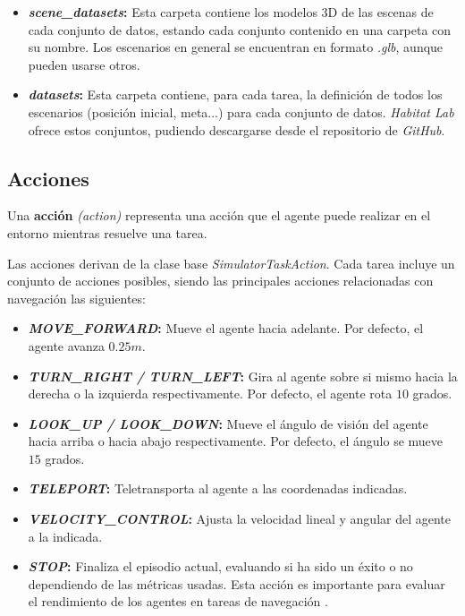 \newpage

\begin{itemize}
	\item \textbf{\textit{scene{\_}datasets}:} Esta carpeta contiene los modelos 3D de las escenas de cada conjunto de datos, estando cada conjunto contenido en una carpeta con su nombre. Los escenarios en general se encuentran en formato \textit{.glb}, aunque pueden usarse otros.
	\item \textbf{\textit{datasets}:} Esta carpeta contiene, para cada tarea, la definición de todos los escenarios (posición inicial, meta...) para cada conjunto de datos. \textit{Habitat Lab} ofrece estos conjuntos, pudiendo descargarse desde el repositorio de \textit{GitHub}. 
\end{itemize}

\subsection{Acciones}

Una \textbf{acción} \textit{(action)} representa una acción que el agente puede realizar en el entorno mientras resuelve una tarea.

Las acciones derivan de la clase base \textit{SimulatorTaskAction}. Cada tarea incluye un conjunto de acciones posibles, siendo las principales acciones relacionadas con navegación las siguientes:

\begin{itemize}
	\item \textbf{\textit{MOVE{\_}FORWARD}:} Mueve el agente hacia adelante. Por defecto, el agente avanza $0.25m$.
	\item \textbf{\textit{TURN{\_}RIGHT / TURN{\_}LEFT}:} Gira al agente sobre si mismo hacia la derecha o la izquierda respectivamente. Por defecto, el agente rota $10$ grados.
	\item \textbf{\textit{LOOK{\_}UP / LOOK{\_}DOWN}:} Mueve el ángulo de visión del agente hacia arriba o hacia abajo respectivamente. Por defecto, el ángulo se mueve $15$ grados.
	\item \textbf{\textit{TELEPORT}:} Teletransporta al agente a las coordenadas indicadas.
	\item \textbf{\textit{VELOCITY{\_}CONTROL}:} Ajusta la velocidad lineal y angular del agente a la indicada.
	\item \textbf{\textit{STOP}:} Finaliza el episodio actual, evaluando si ha sido un éxito o no dependiendo de las métricas usadas. Esta acción es importante para evaluar el rendimiento de los agentes en tareas de navegación \cite{DBLP:journals/corr/abs-1807-06757}.
\end{itemize}

